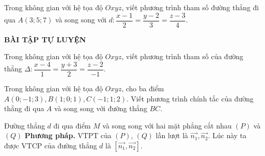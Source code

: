 \begin{vd}%
	Trong không gian với hệ tọa độ $Oxyz$, viết phương trình tham số đường thẳng đi qua $A\left(3;5;7\right)$ và song song với $d:\dfrac{x-1}{2}=\dfrac{y-2}{3}=\dfrac{z-3}{4}$.
	\end{vd}
\begin{center}
\textbf{BÀI TẬP TỰ LUYỆN}
\end{center}
\begin{bt}%
Trong không gian với hệ tọa độ $Oxyz$, viết phương trình tham số của đường thẳng $\Delta:\dfrac{x-4}{1}=\dfrac{y+3}{2}=\dfrac{z-2}{-1}. $
\end{bt}
\begin{bt}%
Trong không gian với hệ tọa độ $Oxyz$, cho ba điểm $A\left(0;-1;3\right), B\left(1;0;1\right), C\left(-1;1;2\right)$. Viết phương trình chính tắc của đường thẳng đi qua $A$ và song song với đường thẳng $BC$.
\end{bt}



\begin{dang}
    {Đường thẳng $d$ đi qua điểm $M$ và song song với hai mặt phẳng cắt nhau $(P)$ và $(Q)$}
    {\bf Phương pháp.} VTPT của $(P)$, $(Q)$ lần lượt là $\vec{n_1}, \vec{n_2}$. Lúc này ta được VTCP của đường thẳng $d$ là $\left[ \vec{n_1}, \vec{n_2} \right]$.
\end{dang}

